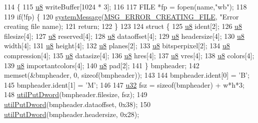 \begin{DoxyCode}
114 \{
115   \mbox{\hyperlink{_system_8h_aed742c436da53c1080638ce6ef7d13de}{u8}} writeBuffer[1024 * 3];
116   
117   FILE *fp = fopen(name,\textcolor{stringliteral}{"wb"});
118 
119   \textcolor{keywordflow}{if}(!fp) \{
120     \mbox{\hyperlink{system_8cpp_a747a9cb8e015a3d45cca636b5bd0fc69}{systemMessage}}(\mbox{\hyperlink{_n_l_s_8h_a165f1f2539e202f0a24e6e9583c63475}{MSG\_ERROR\_CREATING\_FILE}}, \textcolor{stringliteral}{"Error creating file %
      name);
121     \textcolor{keywordflow}{return};
122   \}
123 
124   \textcolor{keyword}{struct }\{
125     \mbox{\hyperlink{_system_8h_aed742c436da53c1080638ce6ef7d13de}{u8}} ident[2];
126     \mbox{\hyperlink{_system_8h_aed742c436da53c1080638ce6ef7d13de}{u8}} filesize[4];
127     \mbox{\hyperlink{_system_8h_aed742c436da53c1080638ce6ef7d13de}{u8}} reserved[4];
128     \mbox{\hyperlink{_system_8h_aed742c436da53c1080638ce6ef7d13de}{u8}} dataoffset[4];
129     \mbox{\hyperlink{_system_8h_aed742c436da53c1080638ce6ef7d13de}{u8}} headersize[4];
130     \mbox{\hyperlink{_system_8h_aed742c436da53c1080638ce6ef7d13de}{u8}} width[4];
131     \mbox{\hyperlink{_system_8h_aed742c436da53c1080638ce6ef7d13de}{u8}} height[4];
132     \mbox{\hyperlink{_system_8h_aed742c436da53c1080638ce6ef7d13de}{u8}} planes[2];
133     \mbox{\hyperlink{_system_8h_aed742c436da53c1080638ce6ef7d13de}{u8}} bitsperpixel[2];
134     \mbox{\hyperlink{_system_8h_aed742c436da53c1080638ce6ef7d13de}{u8}} compression[4];
135     \mbox{\hyperlink{_system_8h_aed742c436da53c1080638ce6ef7d13de}{u8}} datasize[4];
136     \mbox{\hyperlink{_system_8h_aed742c436da53c1080638ce6ef7d13de}{u8}} hres[4];
137     \mbox{\hyperlink{_system_8h_aed742c436da53c1080638ce6ef7d13de}{u8}} vres[4];
138     \mbox{\hyperlink{_system_8h_aed742c436da53c1080638ce6ef7d13de}{u8}} colors[4];
139     \mbox{\hyperlink{_system_8h_aed742c436da53c1080638ce6ef7d13de}{u8}} importantcolors[4];
140     \mbox{\hyperlink{_system_8h_aed742c436da53c1080638ce6ef7d13de}{u8}} pad[2];
141   \} bmpheader;
142   memset(&bmpheader, 0, \textcolor{keyword}{sizeof}(bmpheader));
143 
144   bmpheader.ident[0] = \textcolor{charliteral}{'B'};
145   bmpheader.ident[1] = \textcolor{charliteral}{'M'};
146 
147   \mbox{\hyperlink{_system_8h_a10e94b422ef0c20dcdec20d31a1f5049}{u32}} fsz = \textcolor{keyword}{sizeof}(bmpheader) + w*h*3;
148   \mbox{\hyperlink{_util_8cpp_a61ef2cbdb9d8b5c50004ebd1557439c7}{utilPutDword}}(bmpheader.filesize, fsz);
149   \mbox{\hyperlink{_util_8cpp_a61ef2cbdb9d8b5c50004ebd1557439c7}{utilPutDword}}(bmpheader.dataoffset, 0x38);
150   \mbox{\hyperlink{_util_8cpp_a61ef2cbdb9d8b5c50004ebd1557439c7}{utilPutDword}}(bmpheader.headersize, 0x28);
}
\end{DoxyCode}
